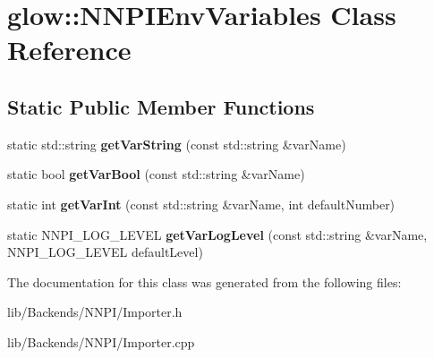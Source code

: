 \hypertarget{classglow_1_1_n_n_p_i_env_variables}{}\section{glow\+:\+:N\+N\+P\+I\+Env\+Variables Class Reference}
\label{classglow_1_1_n_n_p_i_env_variables}
\subsection*{Static Public Member Functions}
\begin{DoxyCompactItemize}
\item 
\mbox{\label{classglow_1_1_n_n_p_i_env_variables_a040ea772ea162d3b223a316557f8028a}} 
static std\+::string {\bfseries get\+Var\+String} (const std\+::string \&var\+Name)
\item 
\mbox{\label{classglow_1_1_n_n_p_i_env_variables_a5126a1d82ff0f75d3091a0e3fe86f51e}} 
static bool {\bfseries get\+Var\+Bool} (const std\+::string \&var\+Name)
\item 
\mbox{\label{classglow_1_1_n_n_p_i_env_variables_a61301fae4779bb3c86dbe7dc247409da}} 
static int {\bfseries get\+Var\+Int} (const std\+::string \&var\+Name, int default\+Number)
\item 
\mbox{\label{classglow_1_1_n_n_p_i_env_variables_a92cee6106ece8102f6942a357365d1c4}} 
static N\+N\+P\+I\+\_\+\+L\+O\+G\+\_\+\+L\+E\+V\+EL {\bfseries get\+Var\+Log\+Level} (const std\+::string \&var\+Name, N\+N\+P\+I\+\_\+\+L\+O\+G\+\_\+\+L\+E\+V\+EL default\+Level)
\end{DoxyCompactItemize}


The documentation for this class was generated from the following files\+:\begin{DoxyCompactItemize}
\item 
lib/\+Backends/\+N\+N\+P\+I/Importer.\+h\item 
lib/\+Backends/\+N\+N\+P\+I/Importer.\+cpp\end{DoxyCompactItemize}
